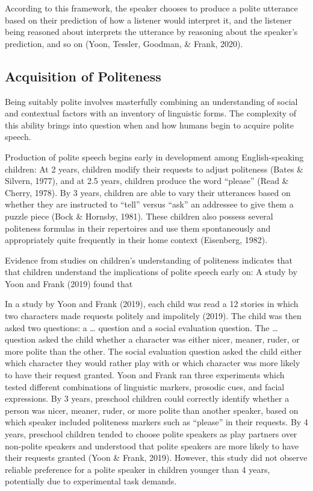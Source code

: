 \documentclass[
  english,
  man,floatsintext]{apa6}
\begin{document}
According to this framework, the speaker chooses to produce a polite utterance based on their prediction of how a listener would interpret it, and the listener being reasoned about interprets the utterance by reasoning about the speaker's prediction, and so on (Yoon, Tessler, Goodman, \& Frank, 2020).

\hypertarget{acquisition-of-politeness}{%
\subsection{Acquisition of Politeness}\label{acquisition-of-politeness}}

Being suitably polite involves masterfully combining an understanding of social and contextual factors with an inventory of linguistic forms. The complexity of this ability brings into question when and how humans begin to acquire polite speech.

Production of polite speech begins early in development among English-speaking children: At 2 years, children modify their requests to adjust politeness (Bates \& Silvern, 1977), and at 2.5 years, children produce the word ``please'' (Read \& Cherry, 1978). By 3 years, children are able to vary their utterances based on whether they are instructed to ``tell'' versus ``ask'' an addressee to give them a puzzle piece (Bock \& Hornsby, 1981). These children also possess several politeness formulas in their repertoires and use them spontaneously and appropriately quite frequently in their home context (Eisenberg, 1982).

Evidence from studies on children's understanding of politeness indicates that that children understand the implications of polite speech early on: A study by Yoon and Frank (2019) found that

In a study by Yoon and Frank (2019), each child was read a 12 stories in which two characters made requests politely and impolitely (2019). The child was then asked two questions: a \ldots{} question and a social evaluation question. The \ldots{} question asked the child whether a character was either nicer, meaner, ruder, or more polite than the other. The social evaluation question asked the child either which character they would rather play with or which character was more likely to have their request granted. Yoon and Frank ran three experiments which tested different combinations of linguistic markers, prosodic cues, and facial expressions. By 3 years, preschool children could correctly identify whether a person was nicer, meaner, ruder, or more polite than another speaker, based on which speaker included politeness markers such as ``please'' in their requests. By 4 years, preschool children tended to choose polite speakers as play partners over non-polite speakers and understood that polite speakers are more likely to have their requests granted (Yoon \& Frank, 2019). However, this study did not observe reliable preference for a polite speaker in children younger than 4 years, potentially due to experimental task demands.
\end{document}
